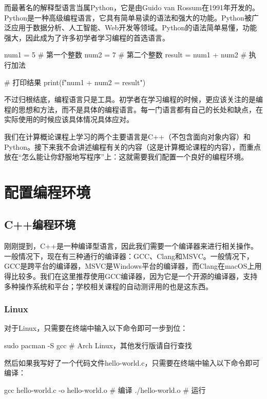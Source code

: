 \documentclass[12pt]{report}
\begin{document}
而最著名的解释型语言当属Python，它是由Guido van Rossum在1991年开发的。Python是一种高级编程语言，它具有简单易读的语法和强大的功能。Python被广泛应用于数据分析、人工智能、Web开发等领域。Python的语法简单易懂，功能强大，因此成为了许多初学者学习编程的首选语言。

\begin{codebox}[title=解释型语言加法运算，Python语法]   
    num1 = 5 # 第一个整数
    num2 = 7 # 第二个整数
    result = num1 + num2 # 执行加法
    
    # 打印结果
    print(f"{num1} + {num2} = {result}")
\end{codebox}

不过归根结底，编程语言只是工具。初学者在学习编程的时候，更应该关注的是编程的思想和方法，而不是具体的编程语言。每一门语言都有自己的长处和缺点，在实际使用的时候应该具体情况具体应对。

我们在计算概论课程上学习的两个主要语言是C++（不包含面向对象内容）和Python。接下来我不会讲述编程有关的内容（这是计算概论课程的内容），而重点放在“怎么能让你舒服地写程序”上：这就需要我们配置一个良好的编程环境。

\section{配置编程环境}

\subsection{C++编程环境}

刚刚提到，C++是一种编译型语言，因此我们需要一个编译器来进行相关操作。一般情况下，现在有三种通行的编译器：GCC、Clang和MSVC。一般情况下，GCC是跨平台的编译器，MSVC是Windows平台的编译器，而Clang在macOS上用得比较多。我们在这里推荐使用GCC编译器，因为它是一个开源的编译器，支持多种操作系统和平台；学校相关课程的自动测评用的也是这东西。

\subsubsection{Linux}

对于Linux，只需要在终端中输入以下命令即可一步到位：
\begin{codebox}[title=Linux安装GCC编译器]   
    sudo pacman -S gcc # Arch Linux，其他发行版请自行查找
\end{codebox}

然后如果我写好了一个代码文件hello-world.c，只需要在终端中输入以下命令即可编译：
\begin{codebox}[title=Linux编译*.c文件]
    gcc hello-world.c -o hello-world.o # 编译
    ./hello-world.o # 运行    
\end{codebox}
\end{document}
